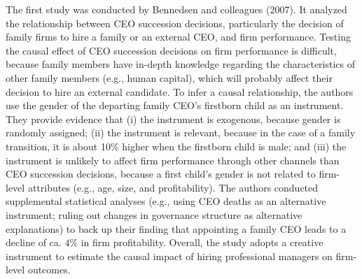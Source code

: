 \documentclass[english]{article}
\begin{document}
The first study was conducted by Bennedsen and colleagues (2007). It
analyzed the relationship between CEO succession decisions, particularly
the decision of family firms to hire a family or an external CEO, and
firm performance. Testing the causal effect of CEO succession decisions
on firm performance is difficult, because family members have in-depth
knowledge regarding the characteristics of other family members (e.g.,
human capital), which will probably affect their decision to hire an
external candidate. To infer a causal relationship, the authors use the
gender of the departing family CEO's firstborn child as an instrument.
They provide evidence that (i) the instrument is exogenous, because
gender is randomly assigned; (ii) the instrument is relevant, because in
the case of a family transition, it is about 10\% higher when the
firstborn child is male; and (iii) the instrument is unlikely to affect
firm performance through other channels than CEO succession decisions,
because a first child's gender is not related to firm-level attributes
(e.g., age, size, and profitability). The authors conducted supplemental
statistical analyses (e.g., using CEO deaths as an alternative
instrument; ruling out changes in governance structure as alternative
explanations) to back up their finding that appointing a family CEO
leads to a decline of ca. $4\%$ in firm profitability. Overall, the
study adopts a creative instrument to estimate the causal impact of
hiring professional managers on firm-level outcomes.
\end{document}
